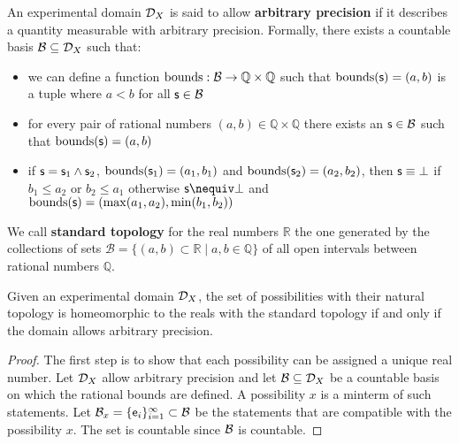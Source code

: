 \documentclass[11pt,letterpaper,fleqn]{memoir} %
\begin{document}
\begin{mathSection}
	
	\begin{defn}
		An experimental domain $\edomain_X$ is said to allow \textbf{arbitrary precision} if it describes a quantity measurable with arbitrary precision. Formally, there exists a countable basis $\basis \subseteq \edomain_X$ such that:
		\begin{itemize}
			\item we can define a function $\operatorname{bounds} : \basis \to \mathbb{Q} \times \mathbb{Q}$ such that $\operatorname{bounds}(\stmt) = (a, b)$ is a tuple where $a < b$ for all $\stmt \in \basis$
			\item for every pair of rational numbers $(a, b) \in \mathbb{Q} \times \mathbb{Q}$ there exists an $\obs \in \basis$ such that $\operatorname{bounds}(\stmt) = (a, b)$
			\item if $\stmt = \stmt_1 \AND \stmt_2$, $\operatorname{bounds}(\stmt_1) = (a_1, b_1)$ and $\operatorname{bounds}(\stmt_2) = (a_2, b_2)$, then $\stmt \equiv \contradiction$ if $b_1 \leq a_2$ or $b_2 \leq a_1$ otherwise $\stmt \nequiv \contradiction$ and $\operatorname{bounds}(\stmt) = (\max(a_1, a_2), \min(b_1, b_2))$
		\end{itemize}
	\end{defn}
	
	\begin{defn}
		We call \textbf{standard topology} for the real numbers $\mathbb{R}$ the one generated by the collections of sets $\mathcal{B} = \{ (a,b) \subset \mathbb{R} \; | \; a,b \in \mathbb{Q} \}$ of all open intervals between rational numbers $\mathbb{Q}$.
	\end{defn}
	
	\begin{thrm}\label{thrm_arbitrary_precision_is_continuity}
		Given an experimental domain $\edomain_X$, the set of possibilities with their natural topology is homeomorphic to the reals with the standard topology if and only if the domain allows arbitrary precision.
	\end{thrm}
	\begin{proof}
		The first step is to show that each possibility can be assigned a unique real number. Let $\edomain_X$ allow arbitrary precision and let $\basis \subseteq \edomain_X$ be a countable basis on which the rational bounds are defined. A possibility $x$ is a minterm of such statements. Let $\basis_x =\{\obs[e]_i\}_{i=1}^{\infty} \subset \basis$ be the statements that are compatible with the possibility $x$. The set is countable since $\basis$ is countable.
		

\end{proof}
\end{mathSection}
\end{document}
